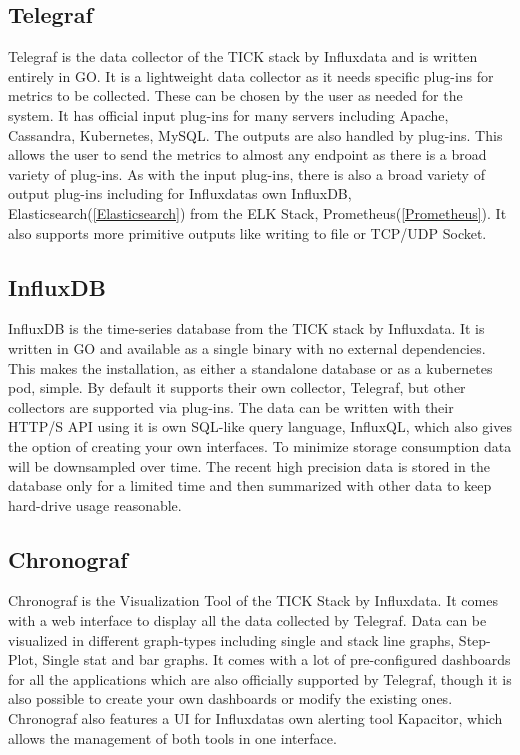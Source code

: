 \subsection{Telegraf}
Telegraf is the data collector of the TICK stack by Influxdata and is written entirely in GO. It is a lightweight data collector as it needs specific plug-ins for metrics to be collected. These can be chosen by the user as needed for the system. It has official input plug-ins for many servers including Apache, Cassandra, Kubernetes, MySQL.
The outputs are also handled by plug-ins. This allows the user to send the metrics to almost any endpoint as there is a broad variety of plug-ins. As with the input plug-ins, there is also a broad variety of output plug-ins including for Influxdatas own InfluxDB, Elasticsearch(\ref{Elasticsearch}) from the ELK Stack, Prometheus(\ref{Prometheus}). It also supports more primitive outputs like writing to file or TCP/UDP Socket.
\subsection{InfluxDB}
InfluxDB is the time-series database from the TICK stack by Influxdata. It is written in GO and available as a single binary with no external dependencies. This makes the installation, as either a standalone database or as a kubernetes pod, simple.
By default it supports their own collector, Telegraf, but other collectors are supported via plug-ins. The data can be written with their  HTTP/S API using it is own SQL-like query language, InfluxQL, which also gives the option of creating your own interfaces.
To minimize storage consumption data will be downsampled over time. The recent high precision data is stored in the database only for a limited time and then summarized with other data to keep hard-drive usage reasonable. 
\subsection{Chronograf}
Chronograf is the Visualization Tool of the TICK Stack by Influxdata. It comes with a web interface to display all the data collected by Telegraf. Data can be visualized in different graph-types including single and stack line graphs, Step-Plot, Single stat and bar graphs. It comes with a lot of pre-configured dashboards for all the applications which are also officially supported by Telegraf, though it is also possible to create your own dashboards or modify the existing ones. 
Chronograf also features a UI for Influxdatas own alerting tool Kapacitor, which allows the management of both tools in one interface.
